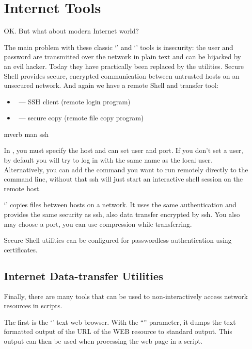 \section*{Internet Tools}

OK. But what about modern Internet world?

The main problem with these classic `' and `' tools is
insecurity: the user and password are transmitted over the network in
plain text and can be hijacked by an evil hacker. Today they have
practically been replaced by the  utilities. Secure Shell
provides secure, encrypted communication between untrusted hosts on
an unsecured network. And again we have a remote Shell and transfer tool:
\begin{itemize}
\item {}~--- SSH client (remote login program)
\item {}~--- secure copy (remote file copy program)
\end{itemize}

\begin{code}{mverb}
man ssh
\end{code}
In , you must specify the host and can set user and port. If you don't
set a user, by default you will try to log in with the same name as the local
user. Alternatively, you can add the command you want to run remotely directly
to the command line, without that ssh will just start an interactive shell
session on the remote host.

`' copies files between hosts on a network.  It uses the same
authentication and provides the same security as ssh, also data transfer
encrypted by ssh. You also may choose a port, you can use compression
while transferring.

Secure Shell utilities can be configured for passwordless authentication
using certificates.

\subsection*{Internet Data-transfer Utilities} %

Finally, there are many tools that can be used to non-interactively
access network resources in scripts.

The first is the `' text web browser. With the ``''
parameter, it dumps the text formatted output of the URL of the WEB resource
to standard output. This output can then be used when processing the web page
in a script.

